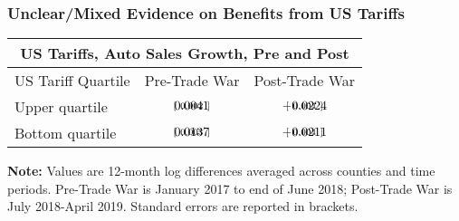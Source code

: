 \documentclass[9pt,pdftex,aspectratio=1610]{beamer}
\theoremstyle{definition}
\begin{document}
\begin{frame}[t]
\frametitle{Unclear/Mixed Evidence on Benefits from US Tariffs}
\begin{table}[t]
\footnotesize
\setlength {\tabcolsep}{4.05mm}
\renewcommand{\arraystretch}{2.30}
\begin{center}
\begin{tabular}{l c c }
\multicolumn{3}{c}{\small \textbf{US Tariffs, Auto Sales Growth, Pre and Post}}\\
\hline
\hline
\footnotesize  US Tariff Quartile & \footnotesize  Pre-Trade War &  \footnotesize  Post-Trade War\\
\hline
\footnotesize  Upper quartile  & $\begin{array}{c}0.0041 \vspace{-.45cm}\\ \scriptstyle [ \ 0.002 \ ]\end{array}$   & $\begin{array}{c}-0.0224 \vspace{-.45cm}\\ \scriptstyle [ \ 0.004 \ ]\end{array}$ \\
\footnotesize  Bottom quartile  & $\begin{array}{c}0.0137 \vspace{-.45cm}\\ \scriptstyle [ \ 0.003 \ ]\end{array}$  & $\begin{array}{c}-0.0211\vspace{-.45cm}\\ \scriptstyle [ \ 0.004 \ ]\end{array}$\\
\hline
\end{tabular}
\parbox[c]{3.1in}{\vspace{.1cm}
{\footnotesize \textbf{Note:} Values  are 12-month log differences averaged across counties and time periods. Pre-Trade War is January 2017 to end of June 2018; Post-Trade War is July 2018-April 2019. Standard errors are reported in brackets.}}
\end{center}
\end{table}
\end{frame}

\end{document}
